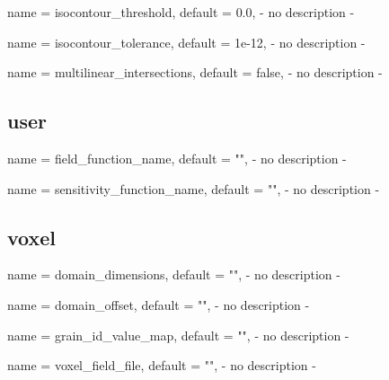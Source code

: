 \begin{parameter}{
    name    = {isocontour_threshold},
    default = {0.0},
}
- no description -
\end{parameter}

\begin{parameter}{
    name    = {isocontour_tolerance},
    default = {1e-12},
}
- no description -
\end{parameter}

\begin{parameter}{
    name    = {multilinear_intersections},
    default = {false},
}
- no description -
\end{parameter}

\subsection{user}

\begin{parameter}{
    name    = {field_function_name},
    default = {""},
}
- no description -
\end{parameter}

\begin{parameter}{
    name    = {sensitivity_function_name},
    default = {""},
}
- no description -
\end{parameter}

\subsection{voxel}

\begin{parameter}{
    name    = {domain_dimensions},
    default = {""},
}
- no description -
\end{parameter}

\begin{parameter}{
    name    = {domain_offset},
    default = {""},
}
- no description -
\end{parameter}

\begin{parameter}{
    name    = {grain_id_value_map},
    default = {""},
}
- no description -
\end{parameter}

\begin{parameter}{
    name    = {voxel_field_file},
    default = {""},
}
- no description -
\end{parameter}

